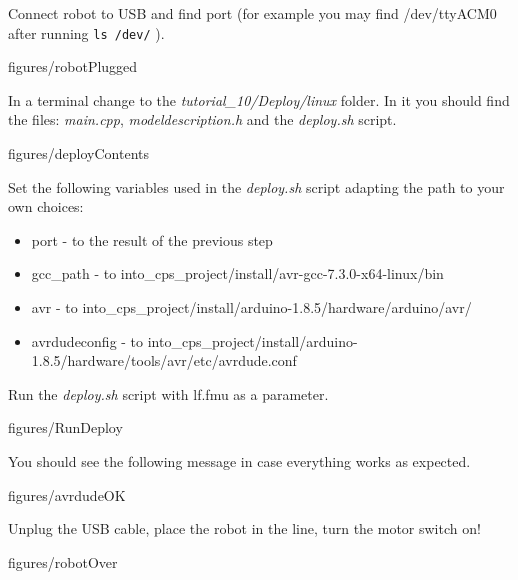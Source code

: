 \documentclass[11pt,a4paper]{../tutorial}
\begin{document}
\begin{instructions} 

\item Connect robot to USB and find port (for example you may find /dev/ttyACM0 after running \verb'ls /dev/' ). 

	
	\begin{annotation}[width=0.85\linewidth,trim={10cm 0 10cm 10cm},clip]{figures/robotPlugged}
	\end{annotation}

\item In a terminal change to the \emph{tutorial\_10/Deploy/linux} folder. In it you should find the files: \emph{main.cpp}, \emph{modeldescription.h} and the \emph{deploy.sh} script. 

	\begin{annotation}[width=0.85\linewidth,trim={0 30cm 0 0},clip]{figures/deployContents}
	\end{annotation}

	
\item Set the following variables used in the \emph{deploy.sh} script adapting the path to your own choices:
	\begin{itemize}
		\item port - to the result of the previous step
		\item gcc\_path - to into\_cps\_project/install/avr-gcc-7.3.0-x64-linux/bin 
		\item avr - to into\_cps\_project/install/arduino-1.8.5/hardware/arduino/avr/ 
		\item avrdudeconfig - to into\_cps\_project/install/arduino-1.8.5/hardware/tools/avr/etc/avrdude.conf
	\end{itemize}
Run the \emph{deploy.sh} script with  lf.fmu as a parameter.

		\begin{annotation}[width=0.85\linewidth,trim={10cm 35cm 15cm 0},clip]{figures/RunDeploy}
	\end{annotation}

\newpage

\item You should see the following message in case everything works as expected. 

	\begin{annotation}[width=0.85\linewidth]{figures/avrdudeOK}
	\end{annotation}


\item Unplug the USB cable, place the robot in the line, turn the motor switch on!
	
	\begin{annotation}[width=0.85\linewidth,trim={10cm 0 10cm 10cm},clip]{figures/robotOver}
	\end{annotation}
\end{instructions}
\end{document}
